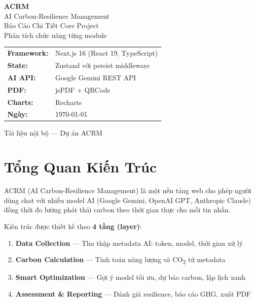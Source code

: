 \documentclass[12pt,a4paper]{article}
\begin{document}
\begin{titlepage}
    \centering
    \vspace*{3cm}

    {\Huge\bfseries\textcolor{brand}{ACRM}}\\[0.5cm]
    {\LARGE AI Carbon-Resilience Management}\\[1.5cm]
    {\Large Báo Cáo Chi Tiết Core Project}\\[0.5cm]
    {\large Phân tích chức năng từng module}\\[3cm]

    \begin{tabular}{ll}
        \textbf{Framework:}  & Next.js 16 (React 19, TypeScript) \\
        \textbf{State:}      & Zustand với persist middleware \\
        \textbf{AI API:}     & Google Gemini REST API \\
        \textbf{PDF:}        & jsPDF + QRCode \\
        \textbf{Charts:}     & Recharts \\
        \textbf{Ngày:}       & \today \\
    \end{tabular}

    \vfill
    {\small Tài liệu nội bộ — Dự án ACRM}
\end{titlepage}

\tableofcontents
\newpage

\section{Tổng Quan Kiến Trúc}

ACRM (AI Carbon-Resilience Management) là một nền tảng web cho phép người dùng chat với nhiều model AI (Google Gemini, OpenAI GPT, Anthropic Claude) đồng thời đo lường phát thải carbon theo thời gian thực cho mỗi tin nhắn.

Kiến trúc được thiết kế theo \textbf{4 tầng (layer)}:

\begin{enumerate}[leftmargin=2cm]
    \item \textbf{Data Collection} — Thu thập metadata AI: token, model, thời gian xử lý
    \item \textbf{Carbon Calculation} — Tính toán năng lượng và CO\textsubscript{2} từ metadata
    \item \textbf{Smart Optimization} — Gợi ý model tối ưu, dự báo carbon, lập lịch xanh
    \item \textbf{Assessment \& Reporting} — Đánh giá resilience, báo cáo GHG, xuất PDF
\end{enumerate}
\end{document}
